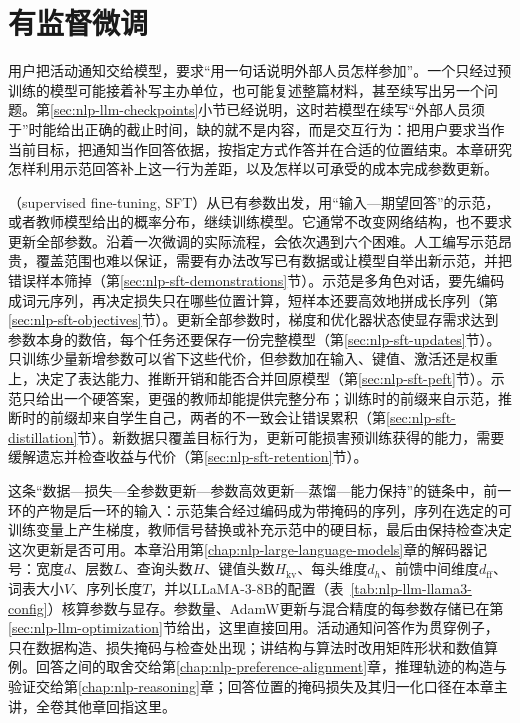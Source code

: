 \chapter{有监督微调}
\label{chap:nlp-supervised-finetuning}

用户把活动通知交给模型，要求“用一句话说明外部人员怎样参加”。一个只经过预训练的模型可能接着补写主办单位，也可能复述整篇材料，甚至续写出另一个问题。第\ref{sec:nlp-llm-checkpoints}小节已经说明，这时若模型在续写“外部人员须于”时能给出正确的截止时间，缺的就不是内容，而是交互行为：把用户要求当作当前目标，把通知当作回答依据，按指定方式作答并在合适的位置结束。本章研究怎样利用示范回答补上这一行为差距，以及怎样以可承受的成本完成参数更新。

（supervised fine-tuning, SFT）从已有参数出发，用“输入—期望回答”的示范，或者教师模型给出的概率分布，继续训练模型。它通常不改变网络结构，也不要求更新全部参数。沿着一次微调的实际流程，会依次遇到六个困难。人工编写示范昂贵，覆盖范围也难以保证，需要有办法改写已有数据或让模型自举出新示范，并把错误样本筛掉（第\ref{sec:nlp-sft-demonstrations}节）。示范是多角色对话，要先编码成词元序列，再决定损失只在哪些位置计算，短样本还要高效地拼成长序列（第\ref{sec:nlp-sft-objectives}节）。更新全部参数时，梯度和优化器状态使显存需求达到参数本身的数倍，每个任务还要保存一份完整模型（第\ref{sec:nlp-sft-updates}节）。只训练少量新增参数可以省下这些代价，但参数加在输入、键值、激活还是权重上，决定了表达能力、推断开销和能否合并回原模型（第\ref{sec:nlp-sft-peft}节）。示范只给出一个硬答案，更强的教师却能提供完整分布；训练时的前缀来自示范，推断时的前缀却来自学生自己，两者的不一致会让错误累积（第\ref{sec:nlp-sft-distillation}节）。新数据只覆盖目标行为，更新可能损害预训练获得的能力，需要缓解遗忘并检查收益与代价（第\ref{sec:nlp-sft-retention}节）。

这条“数据—损失—全参数更新—参数高效更新—蒸馏—能力保持”的链条中，前一环的产物是后一环的输入：示范集合经过编码成为带掩码的序列，序列在选定的可训练变量上产生梯度，教师信号替换或补充示范中的硬目标，最后由保持检查决定这次更新是否可用。本章沿用第\ref{chap:nlp-large-language-models}章的解码器记号：宽度$d$、层数$L$、查询头数$H$、键值头数$H_{\mathrm{kv}}$、每头维度$d_h$、前馈中间维度$d_{\mathrm{ff}}$、词表大小$V$、序列长度$T$，并以LLaMA-3-8B的配置（表~\ref{tab:nlp-llm-llama3-config}）核算参数与显存。参数量、AdamW更新与混合精度的每参数存储已在第\ref{sec:nlp-llm-optimization}节给出，这里直接回用。活动通知问答作为贯穿例子，只在数据构造、损失掩码与检查处出现；讲结构与算法时改用矩阵形状和数值算例。回答之间的取舍交给第\ref{chap:nlp-preference-alignment}章，推理轨迹的构造与验证交给第\ref{chap:nlp-reasoning}章；回答位置的掩码损失及其归一化口径在本章主讲，全卷其他章回指这里。

